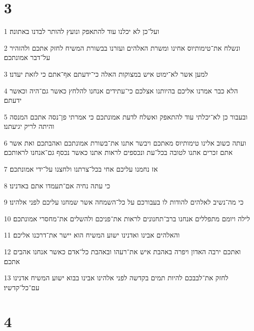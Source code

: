 \chapter{3}

\par 1 ועל־כן לא יכלנו עוד להתאפק ונועץ להותר לבדנו באתונה׃
\par 2 ונשלח את־טימותיוס אחינו ומשרת האלהים ועזרנו בבשורת המשיח לחזק אתכם ולהזהיר על־דבר אמונתכם׃
\par 3 למען אשר לא־ימוט איש במצוקות האלה כי־ידעתם אף־אתם כי לזאת יעדנו׃
\par 4 הלא כבר אמרנו אליכם בהיותנו אצלכם כי־עתידים אנחנו להלחץ כאשר גם־היה וכאשר ידעתם׃
\par 5 ובעבור כן לא־יכלתי עוד להתאפק ואשלח לדעת אמונתכם כי אמרתי פן־נסה אתכם המנסה והיתה לריק יגיעתנו׃
\par 6 ועתה כשוב אלינו טימותיוס מאתכם ויבשר אתנו את־בשורת אמונתכם ואהבתכם ואת אשר אתם זכרים אתנו לטובה בכל־עת ונכספים לראות אתנו כאשר נכסף גם־אנחנו לראותכם׃
\par 7 אז נחמנו עליכם אחי בכל־צרתנו ולחצנו על־ידי אמונתכם׃
\par 8 כי עתה נחיה אם־תעמדו אתם באדנינו׃
\par 9 כי מה־נשיב לאלהים להודות לו בעבורכם על כל־השמחה אשר שמחנו עליכם לפני אלהינו׃
\par 10 לילה ויומם מתפללים אנחנו ברב־תחנונים לראות את־פניכם ולהשלים את־מחסרי אמונתכם׃
\par 11 והאלהים אבינו ואדנינו ישוע המשיח הוא יישר את־דרכנו אליכם׃
\par 12 ואתכם ירבה האדון ויפרה באהבת איש את־רעהו ובאהבת כל־אדם כאשר אנחנו אהבים אתכם׃
\par 13 לחזק את־לבבכם להיות תמים בקדשה לפני אלהינו אבינו בבוא ישוע המשיח אדנינו עם־כל־קדשיו׃

\chapter{4}

